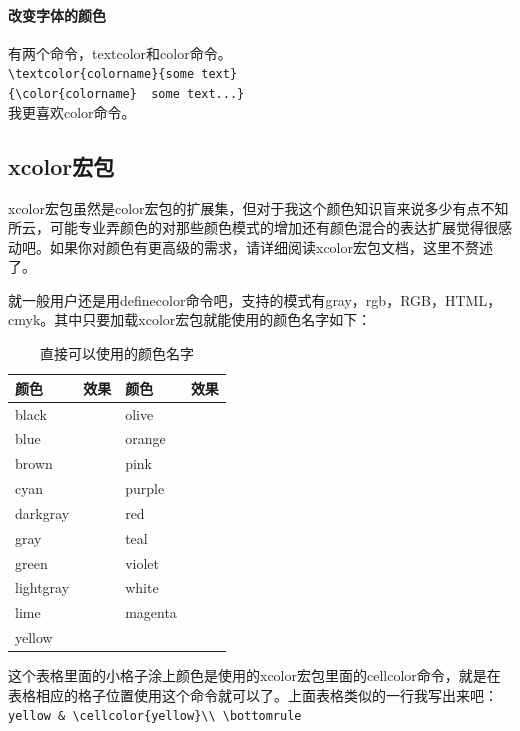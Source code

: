 \documentclass[11pt,oneside]{book}
\begin{document}
\begin{common-format}
\paragraph{改变字体的颜色}
有两个命令，textcolor和color命令。\\
\verb+\textcolor{colorname}{some text}+\\
\verb+{\color{colorname}  some text...}+\\
我更喜欢color命令。

\subsection{xcolor宏包}   
xcolor宏包虽然是color宏包的扩展集，但对于我这个颜色知识盲来说多少有点不知所云，可能专业弄颜色的对那些颜色模式的增加还有颜色混合的表达扩展觉得很感动吧。如果你对颜色有更高级的需求，请详细阅读xcolor宏包文档，这里不赘述了。

就一般用户还是用definecolor命令吧，支持的模式有gray，rgb，RGB，HTML，cmyk。其中只要加载xcolor宏包就能使用的颜色名字如下：
\begin{table}[H]
\begin{tabular}{@{}lp{50pt}lp{50pt}@{}}
\toprule
颜色        & 效果  & 颜色       & 效果\\ \midrule
black     &  \cellcolor{black}  & olive     &    \cellcolor{olive} \\
blue      &   \cellcolor{blue} & orange    &   \cellcolor{orange}\\
brown     &  \cellcolor{brown}  & pink      &   \cellcolor{pink}\\
cyan      &   \cellcolor{cyan} & purple    &   \cellcolor{purple}\\
darkgray  &  \cellcolor{darkgray} &red       &   \cellcolor{red}  \\
gray      &   \cellcolor{gray} & teal      &    \cellcolor{teal}\\
green     &   \cellcolor{green} & violet    &   \cellcolor{violet}\\
lightgray &  \cellcolor{lightgray} &white     &   \cellcolor{white} \\
lime      &    \cellcolor{lime} & magenta   &   \cellcolor{magenta} \\
yellow    &    \cellcolor{yellow}\\ \bottomrule
\end{tabular}
\label{tab:直接可以使用的颜色名字}
\caption{直接可以使用的颜色名字}
\end{table}
这个表格里面的小格子涂上颜色是使用的xcolor宏包里面的cellcolor命令，就是在表格相应的格子位置使用这个命令就可以了。上面表格类似的一行我写出来吧：\\
\verb+yellow & \cellcolor{yellow}\\ \bottomrule+


\end{common-format}
\end{document}
